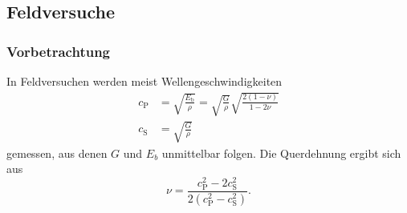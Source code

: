 \subsection{Feldversuche}


\begin{frame}
\frametitle{Vorbetrachtung}
In Feldversuchen werden meist Wellengeschwindigkeiten 
\begin{align*}
 c_\mathrm{P} &= \sqrt{\frac{E_\mathrm{b}}{\rho}} 
 = \sqrt{\frac{G}{\rho}}\sqrt{\frac{2(1-\nu)}{1-2\nu}} \\
 c_\mathrm{S} &= \sqrt{\frac{G}{\rho}} 
\end{align*}
gemessen, aus denen $G$ und $E_b$ unmittelbar folgen.
Die Querdehnung ergibt sich aus
\begin{equation*}
\nu = \frac{c_\mathrm{P}^2 - 2c_\mathrm{S}^2}{2(c_\mathrm{P}^2-c_\mathrm{S}^2)}  .
\end{equation*}
\end{frame}



